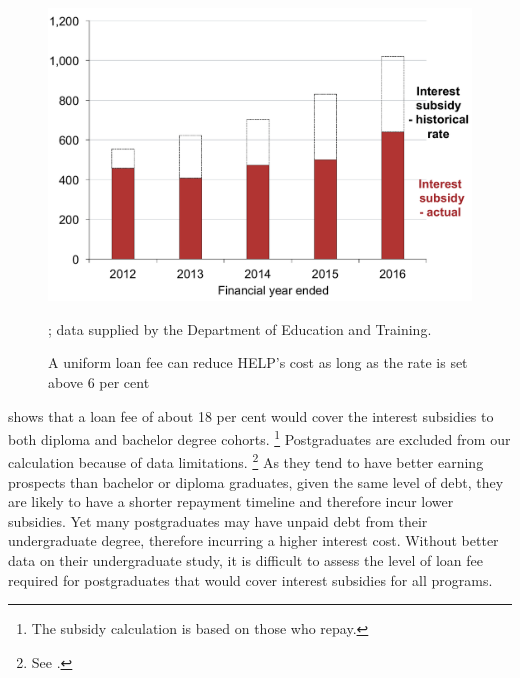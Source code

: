 \documentclass[embargoed]{grattan}
\begin{document}
\begin{figure}
\caption[A uniform loan fee can reduce {HELP}'s cost as long as the rate is set above 6 per cent]{A uniform loan fee can reduce \gls{HELP}'s cost as long as the rate is set above 6 per cent}\label{fig:fig20-uniform-loan-fee-can-reduce-HELPs-cost-as-long-as-the-rate-is-set-above-6pc}

\includegraphics[page=20]{atlas/Chartpack.pdf}

%
{\textcites[][Table~57]{Education2015Highereducationreport}[][15]{Ryan2016RedesigningVETFEE}{Birmingham2016MediareleaseNew}; data supplied by the Department of Education and Training.}
\end{figure}

 shows that a loan fee of about 18 per cent would cover the interest subsidies to both diploma and bachelor degree cohorts.%
\footnote{The subsidy calculation is based on those who repay.} Postgraduates are excluded from our calculation because of data limitations.%
\footnote{See .} As they tend to have better earning prospects than bachelor or diploma graduates, given the same level of debt, they are likely to have a shorter repayment timeline and therefore incur lower subsidies.
Yet many postgraduates may have unpaid debt from their undergraduate degree, therefore incurring a higher interest cost.
Without better data on their undergraduate study, it is difficult to assess the level of loan fee required for postgraduates that would cover interest subsidies for all programs.
\end{document}
